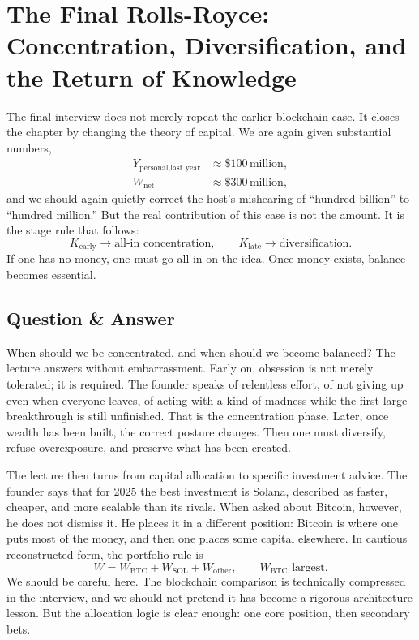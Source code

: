 \section{The Final Rolls-Royce: Concentration, Diversification, and the Return of Knowledge}

The final interview does not merely repeat the earlier blockchain case. It closes the chapter by changing the theory of capital. We are again given substantial numbers,
\begin{align}
Y_{\text{personal,last year}} &\approx \$100\,\text{million}, \\
W_{\text{net}} &\approx \$300\,\text{million},
\end{align}
and we should again quietly correct the host's mishearing of ``hundred billion'' to ``hundred million.'' But the real contribution of this case is not the amount. It is the stage rule that follows:
\begin{equation}
K_{\text{early}} \to \text{all-in concentration},
\qquad
K_{\text{late}} \to \text{diversification}.
\end{equation}
If one has no money, one must go all in on the idea. Once money exists, balance becomes essential.

\subsection{Question \& Answer}

When should we be concentrated, and when should we become balanced? The lecture answers without embarrassment. Early on, obsession is not merely tolerated; it is required. The founder speaks of relentless effort, of not giving up even when everyone leaves, of acting with a kind of madness while the first large breakthrough is still unfinished. That is the concentration phase. Later, once wealth has been built, the correct posture changes. Then one must diversify, refuse overexposure, and preserve what has been created.

The lecture then turns from capital allocation to specific investment advice. The founder says that for 2025 the best investment is Solana, described as faster, cheaper, and more scalable than its rivals. When asked about Bitcoin, however, he does not dismiss it. He places it in a different position: Bitcoin is where one puts most of the money, and then one places some capital elsewhere. In cautious reconstructed form, the portfolio rule is
\begin{equation}
W = W_{\text{BTC}} + W_{\text{SOL}} + W_{\text{other}},
\qquad
W_{\text{BTC}} \text{ largest}.
\end{equation}
We should be careful here. The blockchain comparison is technically compressed in the interview, and we should not pretend it has become a rigorous architecture lesson. But the allocation logic is clear enough: one core position, then secondary bets.

